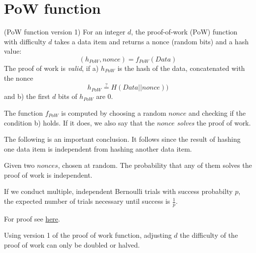 \pagebreak
\section{PoW function}

\begin{definition}\label{def:pow1}
	(PoW function version 1)
	For an integer $d$,
	the proof-of-work (PoW) function with difficulty $d$ takes a data item and returns a nonce (random bits) and a hash value:
	\[
		(h_{PoW}, nonce)=f_{PoW}(Data)
	\]
	The proof of work is \emph{valid}, if a) $h_{PoW}$ is the hash of the data, concatenated with the nonce
	\[
		h_{PoW} \overset{?}{=}H(Data || nonce))
	\]
	and b) the first $d$ bits of $h_{PoW}$ are 0.
\end{definition}

\begin{note}
	The function $f_{PoW}$ is computed by choosing a random $nonce$ and checking if the condition b) holds. If it does, we also say that the $nonce$ 
	\emph{solves} the proof of work.
\end{note}

The following is an important conclusion. It follows since the result of hashing one data item is independent from hashing another data item.

\begin{lem}\label{lem:independent}
	Given two $nonces$, chosen at random. 
	The probability that any of them solves the proof of work is independent.
\end{lem}



\begin{theorem}
	\label{thm:bernoullitrials}
	If we conduct multiple, independent Bernoulli trials with success probabilty $p$, the expected number of trials necessary until success is $\frac{1}{p}$. 
\end{theorem}

For proof see \href{https://cut-the-knot.org/Probability/LengthToFirstSuccess.shtml}{here}.



\begin{note}
Using version 1 of the proof of work function, adjusting $d$ the difficulty of the proof of work can only be doubled or halved.
\end{note}

